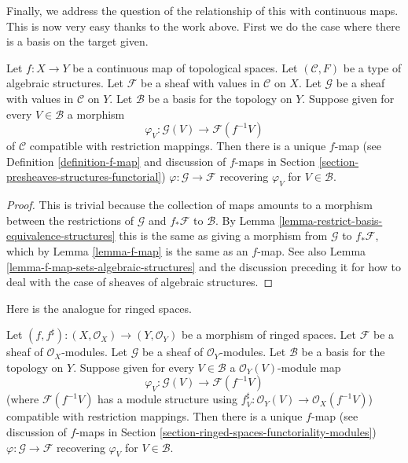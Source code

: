 \noindent
Finally, we address the question of the relationship of this with
continuous maps. This is now very easy thanks to the work
above. First we do the case where there is a basis on the
target given.

\begin{lemma}
\label{lemma-f-map-basis-below-structures}
Let $f : X \to Y$ be a continuous map of topological spaces.
Let $(\mathcal{C}, F)$ be a type of algebraic structures.
Let $\mathcal{F}$ be a sheaf with values in $\mathcal{C}$ on $X$.
Let $\mathcal{G}$ be a sheaf with values in $\mathcal{C}$ on $Y$.
Let $\mathcal{B}$ be a basis for the topology on $Y$.
Suppose given for every $V \in \mathcal{B}$ a morphism
$$
\varphi_V :
\mathcal{G}(V)
\longrightarrow
\mathcal{F}(f^{-1}V)
$$
of $\mathcal{C}$ compatible with restriction mappings. 
Then there is a unique $f$-map (see Definition \ref{definition-f-map}
and discussion of $f$-maps in
Section \ref{section-presheaves-structures-functorial})
$\varphi : \mathcal{G} \to \mathcal{F}$
recovering $\varphi_V$ for $V \in \mathcal{B}$.
\end{lemma}

\begin{proof}
This is trivial because the collection of maps
amounts to a morphism between the restrictions
of $\mathcal{G}$ and $f_*\mathcal{F}$ to $\mathcal{B}$.
By Lemma \ref{lemma-restrict-basis-equivalence-structures}
this is the same as giving a morphism from $\mathcal{G}$
to $f_*\mathcal{F}$, which by Lemma \ref{lemma-f-map}
is the same as an $f$-map. See also
Lemma \ref{lemma-f-map-sets-algebraic-structures}
and the discussion preceding it
for how to deal with the case of sheaves of algebraic structures.
\end{proof}

\noindent
Here is the analogue for ringed spaces.

\begin{lemma}
\label{lemma-f-map-basis-below-modules}
Let $(f, f^\sharp) : (X, \mathcal{O}_X) \to (Y, \mathcal{O}_Y)$
be a morphism of ringed spaces.
Let $\mathcal{F}$ be a sheaf of $\mathcal{O}_X$-modules.
Let $\mathcal{G}$ be a sheaf of $\mathcal{O}_Y$-modules.
Let $\mathcal{B}$ be a basis for the topology on $Y$.
Suppose given for every $V \in \mathcal{B}$ a
$\mathcal{O}_Y(V)$-module map
$$
\varphi_V :
\mathcal{G}(V)
\longrightarrow
\mathcal{F}(f^{-1}V)
$$
(where $\mathcal{F}(f^{-1}V)$ has a module structure using
$f^\sharp_V : \mathcal{O}_Y(V) \to \mathcal{O}_X(f^{-1}V)$)
compatible with restriction mappings. 
Then there is a unique $f$-map (see discussion of $f$-maps in
Section \ref{section-ringed-spaces-functoriality-modules})
$\varphi : \mathcal{G} \to \mathcal{F}$
recovering $\varphi_V$ for $V \in \mathcal{B}$.
\end{lemma}


